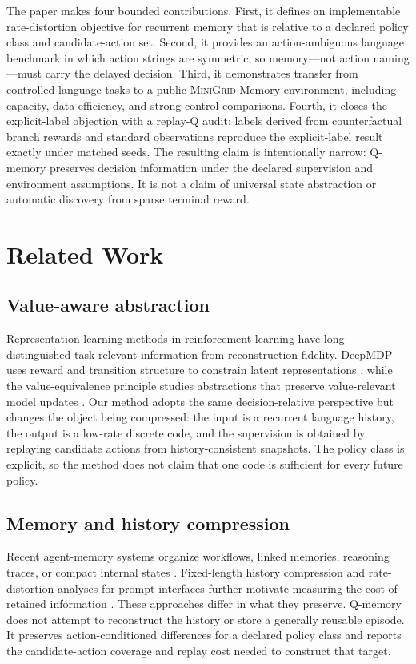 \documentclass[11pt]{article}
\newcommand{\minigrid}{\textsc{MiniGrid}}
\begin{document}
The paper makes four bounded contributions. First, it defines an implementable rate-distortion objective for recurrent memory that is relative to a declared policy class and candidate-action set. Second, it provides an action-ambiguous language benchmark in which action strings are symmetric, so memory---not action naming---must carry the delayed decision. Third, it demonstrates transfer from controlled language tasks to a public \minigrid{} Memory environment, including capacity, data-efficiency, and strong-control comparisons. Fourth, it closes the explicit-label objection with a replay-Q audit: labels derived from counterfactual branch rewards and standard observations reproduce the explicit-label result exactly under matched seeds. The resulting claim is intentionally narrow: Q-memory preserves decision information under the declared supervision and environment assumptions. It is not a claim of universal state abstraction or automatic discovery from sparse terminal reward.

\section{Related Work}
\subsection{Value-aware abstraction}
Representation-learning methods in reinforcement learning have long distinguished task-relevant information from reconstruction fidelity. DeepMDP uses reward and transition structure to constrain latent representations \cite{gelada2019deepmdp}, while the value-equivalence principle studies abstractions that preserve value-relevant model updates \cite{grimm2020value}. Our method adopts the same decision-relative perspective but changes the object being compressed: the input is a recurrent language history, the output is a low-rate discrete code, and the supervision is obtained by replaying candidate actions from history-consistent snapshots. The policy class is explicit, so the method does not claim that one code is sufficient for every future policy.

\subsection{Memory and history compression}
Recent agent-memory systems organize workflows, linked memories, reasoning traces, or compact internal states \cite{wang2025awm,xu2025amem,ouyang2026reasoningbank,zhou2026mem1,wu2025longmemeval}. Fixed-length history compression and rate-distortion analyses for prompt interfaces further motivate measuring the cost of retained information \cite{zhu2025turbo,nagle2024limits}. These approaches differ in what they preserve. Q-memory does not attempt to reconstruct the history or store a generally reusable episode. It preserves action-conditioned differences for a declared policy class and reports the candidate-action coverage and replay cost needed to construct that target.
\end{document}
